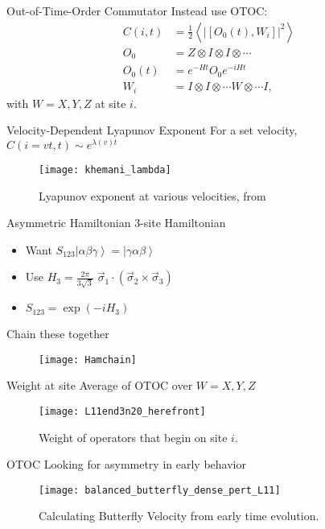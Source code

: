 \documentclass{beamer}
\newcommand{\half}{\frac{1}{2}}
\newcommand{\ex}[1]{\left\langle #1 \right\rangle}
\newcommand{\ket}[1]{\left|#1\right\rangle}
\begin{document}
\begin{frame}{Out-of-Time-Order Commutator}
Instead use OTOC:
\begin{align*}
C(i,t) &= \half\ex{|[O_0(t), W_i]|^2}\\
O_0 &= Z\otimes I\otimes I\otimes\cdots\\
O_0(t) &= e^{-Ht}O_0e^{-iHt}\\
W_i &= I\otimes I\otimes\cdots W\otimes \cdots I,
\end{align*}
with $W=X,Y,Z$ at site $i$.
\end{frame}

\begin{frame}{Velocity-Dependent Lyapunov Exponent}
For a set velocity, $C(i = vt, t) \sim e^{\lambda(v)t}$
\begin{figure}
	\centering
	\texttt{[image: khemani\_lambda]}
	\caption{Lyapunov exponent at various velocities, from \cite{Khemani2018}}
\end{figure}
\end{frame}

\begin{frame}{Asymmetric Hamiltonian}
3-site Hamiltonian
\begin{itemize}
	\item Want $S_{123}\ket{\alpha\beta\gamma} =\ket{\gamma\alpha\beta}$
	\item Use $H_3 = \frac{2\pi}{3\sqrt{3}}\;\vec{\sigma}_1\cdot(\vec{\sigma}_2
		\times\vec{\sigma}_3)$
	\item $S_{123} = \exp\left(-iH_3\right)$\\
\end{itemize}
Chain these together
\begin{figure}
	\centering
	\texttt{[image: Hamchain]}
\end{figure}
\end{frame}

\begin{frame}{Weight at site}
Average of OTOC over $W = X, Y, Z$
\begin{figure}
	\centering
	\texttt{[image: L11end3n20\_herefront]}
	\caption{Weight of operators that begin on site $i$.}
	\label{fig:L11end3n20back}
\end{figure}
\end{frame}

\begin{frame}{OTOC}
Looking for asymmetry in early behavior
\begin{figure}
	\centering
	\texttt{[image: balanced\_butterfly\_dense\_pert\_L11]}
	\caption{Calculating Butterfly Velocity from early time evolution.}
\end{figure}
\end{frame}
\end{document}
